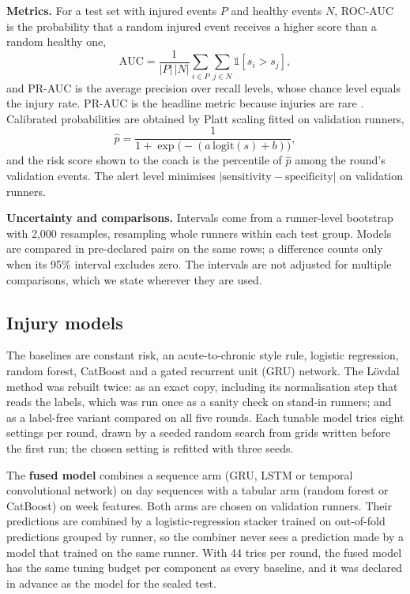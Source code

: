 \documentclass[12pt,a4paper]{article}
\begin{document}
\textbf{Metrics.} For a test set with injured events $P$ and healthy events $N$, ROC-AUC is the
probability that a random injured event receives a higher score than a random healthy one,
\begin{equation}
\mathrm{AUC} = \frac{1}{|P|\,|N|}\sum_{i\in P}\sum_{j\in N}\mathbb{1}[s_i > s_j],
\end{equation}
and PR-AUC is the average precision over recall levels, whose chance level equals the injury
rate. PR-AUC is the headline metric because injuries are rare \citep{he2009}. Calibrated
probabilities are obtained by Platt scaling fitted on validation runners,
\begin{equation}
\hat p = \frac{1}{1 + \exp\!\big(-(a\,\mathrm{logit}(s) + b)\big)},
\end{equation}
and the risk score shown to the coach is the percentile of $\hat p$ among the round's validation
events. The alert level minimises $|\mathrm{sensitivity}-\mathrm{specificity}|$ on validation
runners.

\textbf{Uncertainty and comparisons.} Intervals come from a runner-level bootstrap with 2,000
resamples, resampling whole runners within each test group. Models are compared in pre-declared
pairs on the same rows; a difference counts only when its 95\% interval excludes zero. The
intervals are not adjusted for multiple comparisons, which we state wherever they are used.

\subsection{Injury models}
The baselines are constant risk, an acute-to-chronic style rule, logistic regression, random
forest, CatBoost and a gated recurrent unit (GRU) network. The L\"ovdal method was rebuilt twice:
as an exact copy, including its normalisation step that reads the labels, which was run once as a
sanity check on stand-in runners; and as a label-free variant compared on all five rounds. Each
tunable model tries eight settings per round, drawn by a seeded random search from grids written
before the first run; the chosen setting is refitted with three seeds.

The \textbf{fused model} combines a sequence arm (GRU, LSTM or temporal convolutional network)
on day sequences with a tabular arm (random forest or CatBoost) on week features. Both arms are
chosen on validation runners. Their predictions are combined by a logistic-regression stacker
trained on out-of-fold predictions grouped by runner, so the combiner never sees a prediction
made by a model that trained on the same runner. With 44 tries per round, the fused model has
the same tuning budget per component as every baseline, and it was declared in advance as the
model for the sealed test.
\end{document}
